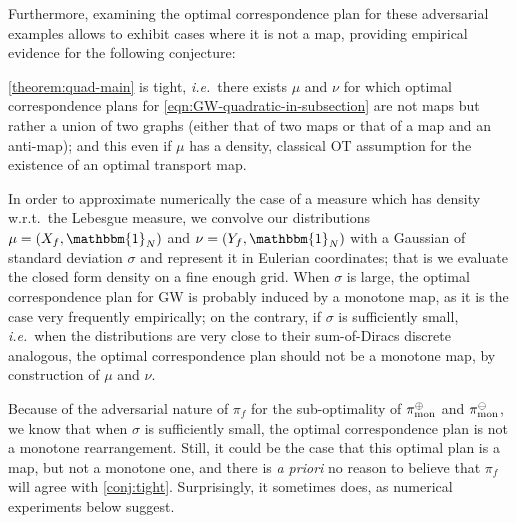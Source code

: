             Furthermore, examining the optimal correspondence plan for these adversarial examples allows to exhibit cases where it is not a map, providing empirical evidence for the following conjecture:
                    \begin{conjecture}
                        \label{conj:tight}
                        \cref{theorem:quad-main} is tight, \textit{i.e.}~there exists $\mu$ and $\nu$ for which optimal correspondence plans for \cref{eqn:GW-quadratic-in-subsection} are not maps but rather a union of two graphs (either that of two maps or that of a map and an anti-map); and this even if $\mu$ has a density, classical OT assumption for the existence of an optimal transport map.
                    \end{conjecture}
            In order to approximate numerically the case of a measure which has density w.r.t.~the Lebesgue measure, we convolve our distributions $\mu=(X_f,\mathbbm{1}_N)$ and $\nu=(Y_f,\mathbbm{1}_N)$ with a Gaussian of standard deviation $\sigma$ and represent it in Eulerian coordinates; that is we evaluate the closed form density on a fine enough grid.
            When $\sigma$ is large, the optimal correspondence plan for GW is probably induced by a monotone map, as it is the case very frequently empirically; on the contrary, if $\sigma$ is sufficiently small, \textit{i.e.}~when the distributions are very close to their sum-of-Diracs discrete analogous, the optimal correspondence plan should not be a monotone map, by construction of $\mu$ and $\nu$.

                    \begin{remark}
                        Because of the adversarial nature of $\pi_f$ for the sub-optimality of $\pi_\text{mon}^\oplus$ and $\pi_\text{mon}^\ominus$, we know that when $\sigma$ is sufficiently small, the optimal correspondence plan is not a monotone rearrangement. Still, it could be the case that this optimal plan is a map, but not a monotone one, and there is \textit{a priori} no reason to believe that $\pi_f$ will agree with \cref{conj:tight}. Surprisingly, it sometimes does, as numerical experiments below suggest.
                    \end{remark}

